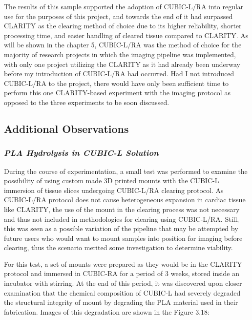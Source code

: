 The results of this sample supported the adoption of CUBIC-L/RA into regular use for the purposes of this project, and towards the end of it had surpassed CLARITY as the clearing method of choice due to its higher reliability, shorter processing time, and easier handling of cleared tissue compared to CLARITY. As will be shown in the chapter 5, CUBIC-L/RA was the method of choice for the majority of research projects in which the imaging pipeline was implemented, with only one project utilizing the CLARITY as it had already been underway before my introduction of CUBIC-L/RA had occurred. Had I not introduced CUBIC-L/RA to the project, there would have only been sufficient time to perform this one CLARITY-based experiment with the imaging protocol as opposed to the three experiments to be soon discussed. 


\subsection{Additional Observations}
\subsubsection{\textit{PLA Hydrolysis in CUBIC-L Solution}}

During the course of experimentation, a small test was performed to examine the possibility of using custom made 3D printed mounts with the CUBIC-L immersion of tissue slices undergoing CUBIC-L/RA clearing protocol. As CUBIC-L/RA protocol does not cause heterogeneous expansion in cardiac tissue like CLARITY, the use of the mount in the clearing process was not necessary and thus not included in methodologies for clearing using CUBIC-L/RA. Still, this was seen as a possible variation of the pipeline that may be attempted by future users who would want to mount samples into position for imaging before clearing, thus the scenario merited some investigation to determine viability. 

For this test, a set of mounts were prepared as they would be in the CLARITY protocol and immersed in CUBIC-RA for a period of 3 weeks, stored inside an incubator with stirring. At the end of this period, it was discovered upon closer examination that the chemical composition of CUBIC-L had severely degraded the structural integrity of mount by degrading the PLA material used in their fabrication. Images of this degradation are shown in the Figure 3.18:

